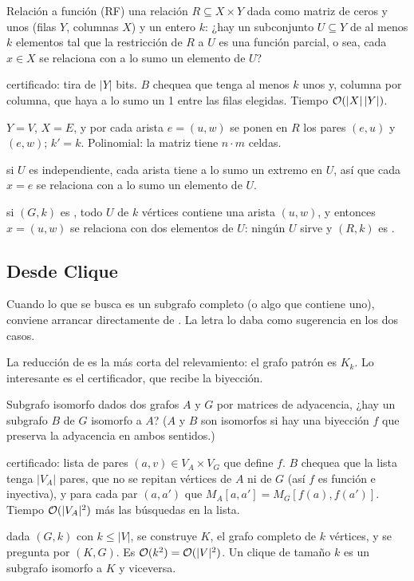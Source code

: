 \begin{problema}{Relación a función (RF)}
 una relación $R\subseteq X\times Y$ dada como matriz de ceros y unos (filas $Y$, columnas $X$) y un entero $k$: ¿hay un subconjunto $U\subseteq Y$ de al menos $k$ elementos tal que la restricción de $R$ a $U$ es una función parcial, o sea, cada $x\in X$ se relaciona con a lo sumo un elemento de $U$?

 certificado: tira de $|Y|$ bits. $B$ chequea que tenga al menos $k$ unos y, columna por columna, que haya a lo sumo un 1 entre las filas elegidas. Tiempo $\mathcal{O}(|X|\,|Y|)$.

 $Y=V$, $X=E$, y por cada arista $e=(u,w)$ se ponen en $R$ los pares $(e,u)$ y $(e,w)$; $k'=k$. Polinomial: la matriz tiene $n\cdot m$ celdas.

 si $U$ es independiente, cada arista tiene a lo sumo un extremo en $U$, así que cada $x=e$ se relaciona con a lo sumo un elemento de $U$.

 si $(G,k)$ es \npno, todo $U$ de $k$ vértices contiene una arista $(u,w)$, y entonces $x=(u,w)$ se relaciona con dos elementos de $U$: ningún $U$ sirve y $(R,k)$ es \npno.
\end{problema}

\subsection{Desde Clique}

Cuando lo que se busca es un subgrafo completo (o algo que contiene uno), conviene arrancar directamente de \npCL. La letra lo daba como sugerencia en los dos casos.

La reducción de  es la más corta del relevamiento: el grafo patrón es $K_k$. Lo interesante es el certificador, que recibe la biyección.

\begin{problema}{Subgrafo isomorfo}
 dados dos grafos $A$ y $G$ por matrices de adyacencia, ¿hay un subgrafo $B$ de $G$ isomorfo a $A$? ($A$ y $B$ son isomorfos si hay una biyección $f$ que preserva la adyacencia en ambos sentidos.)

 certificado: lista de pares $(a,v)\in V_A\times V_G$ que define $f$. $B$ chequea que la lista tenga $|V_A|$ pares, que no se repitan vértices de $A$ ni de $G$ (así $f$ es función e inyectiva), y para cada par $(a,a')$ que $M_A[a,a']=M_G[f(a),f(a')]$. Tiempo $\mathcal{O}(|V_A|^2)$ más las búsquedas en la lista.

 dada $(G,k)$ con $k\le|V|$, se construye $K$, el grafo completo de $k$ vértices, y se pregunta por $(K,G)$. Es $\mathcal{O}(k^2)=\mathcal{O}(|V|^2)$. Un clique de tamaño $k$ es un subgrafo isomorfo a $K$ y viceversa.
\end{problema}

